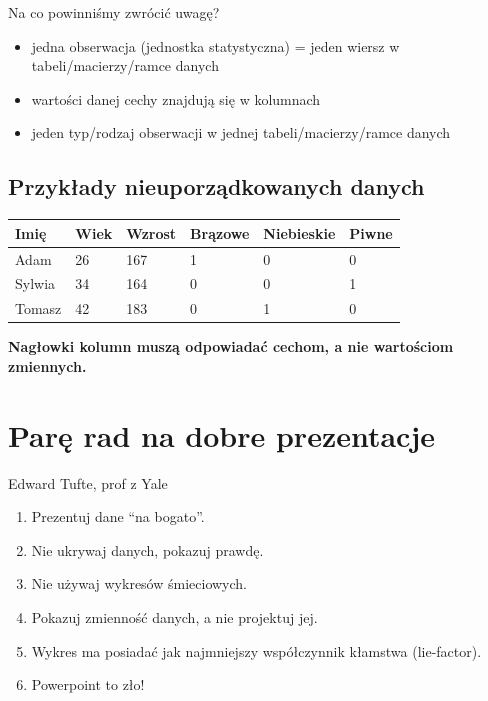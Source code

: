 \documentclass[
  polish,
  letterpaper,
  DIV=11,
  numbers=noendperiod]{scrreprt}
\newcounter{none} %
\providecommand{\tightlist}{%
  \setlength{\itemsep}{0pt}\setlength{\parskip}{0pt}}
\begin{document}
Na co powinniśmy zwrócić uwagę?

\begin{itemize}
\tightlist
\item
  jedna obserwacja (jednostka statystyczna) = jeden wiersz w
  tabeli/macierzy/ramce danych
\item
  wartości danej cechy znajdują się w kolumnach
\item
  jeden typ/rodzaj obserwacji w jednej tabeli/macierzy/ramce danych
\end{itemize}

\subsection{Przykłady nieuporządkowanych
danych}\label{przykux142ady-nieuporzux105dkowanych-danych}

{\def\LTcaptype{none} %
\begin{longtable}[]{@{}llllll@{}}
\toprule\noalign{}
Imię & Wiek & Wzrost & Brązowe & Niebieskie & Piwne \\
\midrule\noalign{}
\endhead
\bottomrule\noalign{}
\endlastfoot
Adam & 26 & 167 & 1 & 0 & 0 \\
Sylwia & 34 & 164 & 0 & 0 & 1 \\
Tomasz & 42 & 183 & 0 & 1 & 0 \\
\end{longtable}
}

\textbf{Nagłowki kolumn muszą odpowiadać cechom, a nie wartościom
zmiennych.}

\section{Parę rad na dobre
prezentacje}\label{parux119-rad-na-dobre-prezentacje}

Edward Tufte, prof z Yale

\begin{enumerate}
\def\labelenumi{\arabic{enumi}.}
\item
  Prezentuj dane ``na bogato''.
\item
  Nie ukrywaj danych, pokazuj prawdę.
\item
  Nie używaj wykresów śmieciowych.
\item
  Pokazuj zmienność danych, a nie projektuj jej.
\item
  Wykres ma posiadać jak najmniejszy współczynnik kłamstwa (lie-factor).
\item
  Powerpoint to zło!
\end{enumerate}
\end{document}
